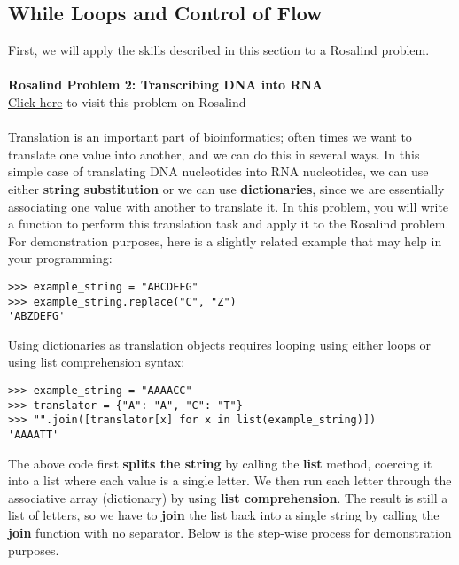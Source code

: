\documentclass[a4paper,11pt]{article}
\begin{document}
\pagebreak
\subsection{While Loops and Control of Flow}

First, we will apply the skills described in this section to a Rosalind problem. \\
\\
\textbf{Rosalind Problem 2: Transcribing DNA into RNA} \\
\href{http://rosalind.info/problems/rna/?class=246}{Click here} to visit this problem on Rosalind \\
\\
Translation is an important part of bioinformatics; often times we want to translate one value into another, 
and we can do this in several ways.  In this simple case of translating DNA nucleotides into RNA nucleotides, 
we can use either \textbf{string substitution} or we can use \textbf{dictionaries}, since we are essentially 
associating one value with another to translate it.  In this problem, you will write a function to perform 
this translation task and apply it to the Rosalind problem.  For demonstration purposes, here is a slightly 
related example that may help in your programming:

\vspace{3mm}
\begin{lstlisting}
>>> example_string = "ABCDEFG"
>>> example_string.replace("C", "Z")
'ABZDEFG'
\end{lstlisting}
\vspace{3mm}

Using dictionaries as translation objects requires looping using either loops or using list comprehension 
syntax:

\vspace{3mm}
\begin{lstlisting}
>>> example_string = "AAAACC"
>>> translator = {"A": "A", "C": "T"}
>>> "".join([translator[x] for x in list(example_string)])
'AAAATT'
\end{lstlisting}
\vspace{3mm}

The above code first \textbf{splits the string} by calling the \textbf{list} method, coercing it into a list 
where each value is a single letter.  We then run each letter through the associative array (dictionary) by 
using \textbf{list comprehension}.  The result is still a list of letters, so we have to \textbf{join} the 
list back into a single string by calling the \textbf{join} function with no separator.  Below is the 
step-wise process for demonstration purposes.
\end{document}
